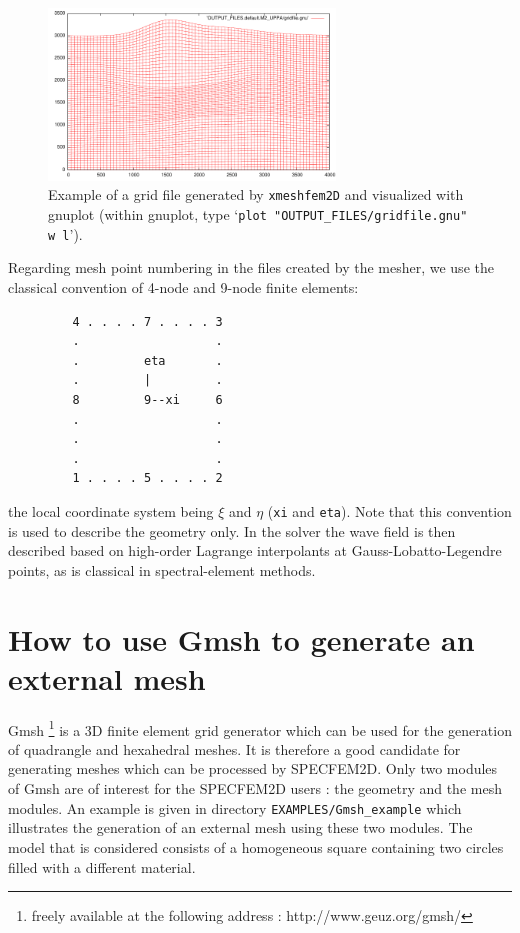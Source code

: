\documentclass[oneside,english,onecolumn,letterpaper]{book}
\begin{document}
\begin{figure}[htbp]
\centering
\includegraphics[width=3in]{figures/example-gridfile.pdf}
\caption{Example of a grid file generated by \texttt{xmeshfem2D} and visualized with gnuplot
(within gnuplot, type `\texttt{plot "OUTPUT\_FILES/gridfile.gnu" w l}').}
\label{fig:example.mesh}
\end{figure}

Regarding mesh point numbering in the files created by the mesher, we use the classical convention of 4-node and 9-node finite elements:
%
\begin{verbatim}
         4 . . . . 7 . . . . 3
         .                   .
         .         eta       .
         .         |         .
         8         9--xi     6
         .                   .
         .                   .
         .                   .
         1 . . . . 5 . . . . 2
\end{verbatim}
%
the local coordinate system being $\xi$ and $\eta$ (\texttt{xi} and \texttt{eta}).
Note that this convention is used to describe the geometry only. In the solver the wave field is then described based on high-order Lagrange interpolants
at Gauss-Lobatto-Legendre points, as is classical in spectral-element methods.

\section{How to use Gmsh to generate an external mesh}

Gmsh%
\footnote{freely available at the following address : http://www.geuz.org/gmsh/%
} is a 3D finite element grid generator which can be used for the generation
of quadrangle and hexahedral meshes. It is therefore a good candidate
for generating meshes which can be processed by SPECFEM2D. Only two
modules of Gmsh are of interest for the SPECFEM2D users : the geometry
and the mesh modules. An example is given in directory \texttt{EXAMPLES/Gmsh\_example}
which illustrates the generation of an external mesh using these two
modules. The model that is considered consists of a homogeneous
square containing two circles filled with a different material.
\end{document}
